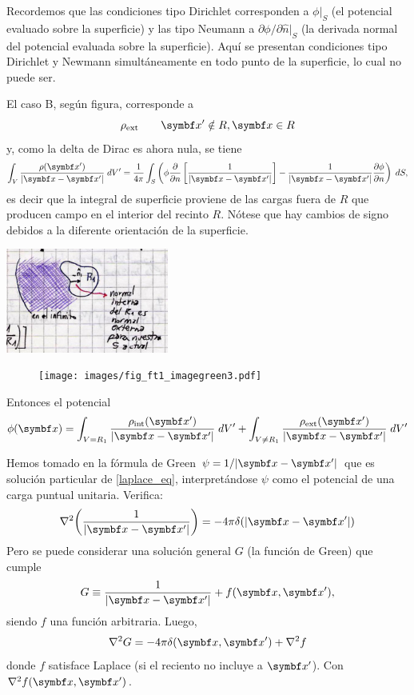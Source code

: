\documentclass[10pt,oneside]{CBFT_book}
\begin{document}
Recordemos que las condiciones tipo Dirichlet corresponden a $\phi|_S$ (el potencial evaluado sobre
la superficie) y las tipo Neumann a $ \partial\phi/\partial \hat{n}|_S $ (la derivada normal del
potencial evaluada sobre la superficie).
Aquí se presentan condiciones tipo Dirichlet y Newmann simultáneamente en todo punto de la superficie,
lo cual no puede ser.

El caso B, según figura, corresponde a
\[
	\rho_{\text{ext}} \qquad \vb{x}'\notin R, \vb{x}\in R
\]
y, como la delta de Dirac es ahora nula, se tiene  
\[
	\int_V \frac{\rho(\vb{x}')}{|\vb{x}-\vb{x}'|} \; dV' = 
	\frac{1}{4\pi} \int_S \left( \phi\frac{\partial}{\partial n} \left[\frac{1}{|\vb{x}-\vb{x}'|} \right]
	- \frac{1}{|\vb{x}-\vb{x}'|}\dpar{\phi}{n}  \right)\; dS,
\]
es decir que la integral de superficie proviene de las cargas fuera de $R$ que producen campo en el interior
del recinto $R$.
Nótese que hay cambios de signo debidos a la diferente orientación de la superficie.

\includegraphics[width=0.4\textwidth]{images/fig_ft1_green_normales.jpg}

\begin{figure}[htb]
	\begin{center}
	\texttt{[image: images/fig\_ft1\_imagegreen3.pdf]}
	\end{center}
	\caption{}
\end{figure}

Entonces el potencial 
\[
	\phi(\vb{x}) = \int_{ V = R_1 } \frac{\rho_{\text{int}}(\vb{x}')}{|\vb{x}-\vb{x}'|} \; dV' +
	\int_{ V \neq R_1 } \frac{\rho_{\text{ext}}(\vb{x}')}{|\vb{x}-\vb{x}'|} \; dV'
\]

Hemos tomado en la fórmula de Green $\psi=1/|\vb{x}-\vb{x}'|$ que es solución particular de \eqref{laplace_eq},
interpretándose $\psi$ como el potencial de una carga puntual unitaria. Verifica:
\[
	\lapm{\left( \frac{1}{|\vb{x}-\vb{x}'|} \right)} = - 4\pi \delta( |\vb{x}-\vb{x}'| )
\]
Pero se puede considerar una solución general $G$ (la función de Green) que cumple 
\[
	G \equiv \frac{1}{|\vb{x}-\vb{x}'|} + f( \vb{x}, \vb{x}'),
\]
siendo $f$ una función arbitraria. Luego,
\[
	\lapm{G} = -4\pi  \delta( \vb{x}, \vb{x}' ) + \lapm{f}
\]
donde $f$ satisface Laplace (si el reciento no incluye a $\vb{x}'$).
Con $\lapm{f( \vb{x}, \vb{x}' )}$.
\end{document}
